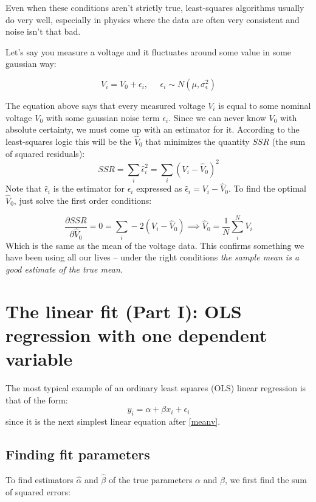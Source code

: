 Even when these conditions aren't strictly true, least-squares algorithms usually do very well, especially in physics where the data are often very consistent and noise isn't that bad.
\begin{example} Let's say you measure a voltage and it fluctuates around some value in some gaussian way:

\begin{equation}
V_i = V_0 + \epsilon_i , \; \; \; \; \; \epsilon_i \sim N(\mu, \sigma_\epsilon^2) \label{meanv}
\end{equation}

The equation above says that every measured voltage $V_i$ is equal to some nominal voltage $V_0$ with some gaussian noise term $\epsilon_i$. Since we can never know $V_0$ with absolute certainty, we must come up with an estimator for it. According to the least-squares logic this will be the $\hat V_0$ that minimizes the quantity $SSR$ (the sum of squared residuals):
\begin{equation}
SSR = \sum_i \hat\epsilon_i^2 = \sum_i (V_i - \hat V_0)^2
\end{equation}
Note that $\hat \epsilon_i$ is the estimator for $\epsilon_i$ expressed as $\hat \epsilon_i = V_i - \hat V_0$. To find the optimal $\hat V_0$, just solve the first order conditions:

\begin{equation}
\frac{\partial SSR}{\partial \hat V_0} = 0 =  \sum_i -2(V_i - \hat V_0) \implies \hat V_0 = \frac{1}{N} \sum_i^N V_i 
\end{equation}
Which is the same as the mean of the voltage data. This confirms something we have been using all our lives -- under the right conditions \emph{the sample mean is a good estimate of the true mean}.
\end{example}

\section{The linear fit (Part I): OLS regression with one dependent variable}
The most typical example of an ordinary least squares (OLS) linear regression is that of the form:
\begin{equation}
y_i = \alpha + \beta x_i + \epsilon_i
\end{equation}
since it is the next simplest linear equation after \eqref{meanv}.

\subsection{Finding fit parameters}
To find estimators $\hat \alpha$ and $\hat \beta$ of the true parameters $\alpha$ and $\beta$, we first find the sum of squared errors:


